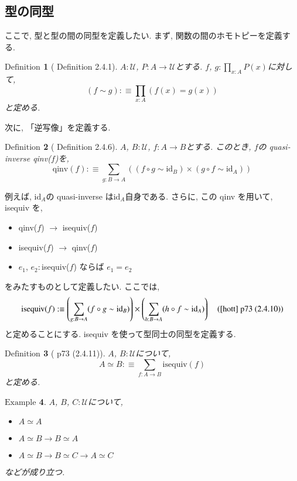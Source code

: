 \documentclass[11pt]{jarticle}
\theoremstyle{mystyle}
\newtheorem{df}{$\textrm{Definition}$}[subsection]
\newtheorem{ex}[df]{$\textrm{Example}$}
\newcommand{\bdf}{\begin{shadebox} \begin{df}}
\newcommand{\edf}{\end{df} \end{shadebox}}
\newcommand{\bex}{\begin{ex}}
\newcommand{\eex}{\end{ex}}
\newcommand{\U}{\mathcal{U}}
\newcommand{\id}{\textrm{id}}
\newcommand{\qinv}{\textrm{qinv}}
\newcommand{\iseq}{\textrm{isequiv}}
\newcommand{\0}{\textbf{0}}
\newcommand{\1}{\textbf{1}}
\newcommand{\2}{\textbf{2}}
\begin{document}
\subsection{型の同型}
ここで, 型と型の間の同型を定義したい. まず, 関数の間のホモトピーを定義する. 
\bdf[\cite{hott} Definition 2.4.1]
  $A : \U$, $P : A \to \U$とする. $f$, $g : \prod_{x : A} P(x)$に対して, 
  \[
    (f \sim g) :\equiv \prod_{x : A} (f(x) = g(x))
  \]
  と定める. 
\edf
次に, 「逆写像」を定義する. 
\bdf[\cite{hott} Definition 2.4.6]
  $A$, $B : \U$, $f : A \to B$とする. このとき, $f$の quasi-inverse qinv($f$)を, 
  \[
    \qinv(f) :\equiv \sum_{g : B \to A} ((f \circ g \sim \id_B) \times
                                                   (g \circ f \sim \id_A))
  \]
\edf
例えば, id$_A$の quasi-inverse はid$_A$自身である. さらに, この qinv を用いて, isequiv を, 
\begin{itemize}
  \item qinv($f$) $\to$ isequiv($f$)
  \item isequiv($f$) $\to$ qinv($f$)
  \item $e_1$, $e_2 :$isequiv($f$) ならば $e_1 = e_2$
\end{itemize}
をみたすものとして定義したい. ここでは, 
\[
  \iseq(f) :\equiv \left( \sum_{g : B \to A} (f \circ g \sim \id_B) \right) \times
                           \left( \sum_{h : B \to A} (h \circ f \sim \id_A) \right) \quad
                           \text{(\cite{hott} p73 (2.4.10))}
\]
と定めることにする. isequiv を使って型同士の同型を定義する. 
\bdf[\cite{hott} p73 (2.4.11)]
  $A$, $B : \U$について, 
  \[
    A \simeq B :\equiv \sum_{f : A \to B} \iseq(f)
  \]
  と定める. 
\edf
\bex
$A$, $B$, $C : \U$について, 
\begin{itemize}
  \item $A \simeq A$
  \item $A \simeq B \to B \simeq A$
  \item $A \simeq B \to B \simeq C \to A \simeq C$
\end{itemize}
などが成り立つ. 
\eex
\end{document}
